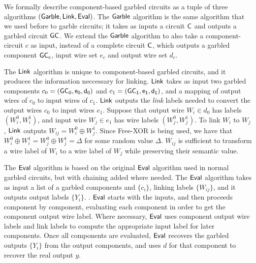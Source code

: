 We formally describe component-based garbled circuits as a tuple of three algorithms $(\sf{Garble}, \sf{Link}, \sf{Eval})$.
The $\sf{Garble}$ algorithm is the same algorithm that we used before to garble circuits; it takes as inputs a circuit $\sf {C}$ and outputs a garbled circuit $\sf {GC}$. 
We extend the $\sf{Garble}$ algorithm to also take a component-circuit $c$ as input, instead of a complete circuit $\sf {C}$, which outputs a garbled component $\sf {GC}_c$, input wire set $e_c$ and output wire set $d_c$. 

The $\sf{Link}$ algorithm is unique to component-based garbled circuits, and it produces the information neccessary for linking.
$\sf{Link}$ takes as input two garbled components $c_0 = (\sf {GC}_0, e_0, d_0)$ and $c_1 = (\sf {GC}_1, e_1, d_1)$, and a mapping of output wires of $c_0$ to input wires of $c_1$. 
$\sf{Link}$ outputs the \textit{link} labels needed to convert the output wires $c_0$ to input wires $e_1$. 
Suppose that output wire $W_i \in d_0$ has labels $(W_i^0, W_i^1)$, and input wire $W_j \in e_1$ has wire labels $(W_j^0, W_j^1)$.
To link $W_i$ to $W_j$, $\sf{Link}$ outputs $W_{ij} = W_i^0 \oplus W_j^1$. 
Since Free-XOR is being used, we have that $W_i^0 \oplus W_i^1 = W_j^0 \oplus W_j^1 = \Delta$ for some random value $\Delta$.
$W_{ij}$ is sufficient to transform a wire label of $W_i$ to a wire label of $W_j$ while preserving their semantic value. 

The $\sf{Eval}$ algorithm is based on the original $\sf{Eval}$ algorithm used in normal garbled circuits, but with chaining added where needed.
The $\sf{Eval}$ algorithm takes as input a list of a garbled components and $\{c_i\}$, linking labels $\{W_{ij}\}$, and it outputs output labels $\{Y_i\}$. 
.
$\sf{Eval}$ starts with the inputs, and then proceeds component by component, evaluating each component in order to get the component output wire label.
Where necessary, $\sf{Eval}$ uses component output wire labels and link labels to compute the appropriate input label for later components. 
Once all components are evaluated, $\sf{Eval}$ recovers the garbled outputs $\{Y_i\}$ from the output components, and uses $d$ for that component to recover the real output $y$. 

